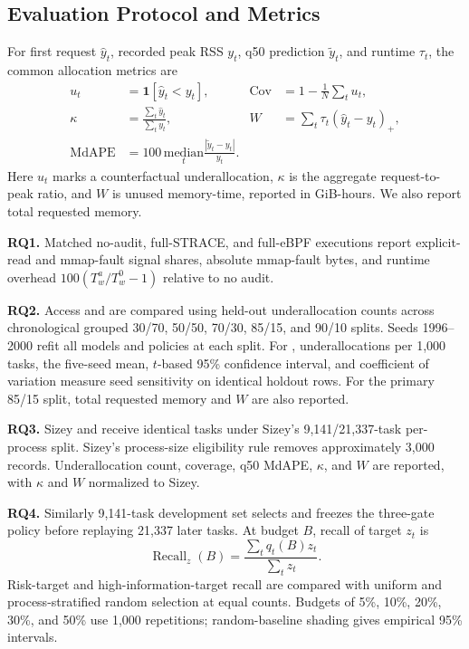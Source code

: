 \subsection{Evaluation Protocol and Metrics}

For first request $\hat y_t$, recorded peak RSS $y_t$, q50 prediction
$\tilde y_t$, and runtime $\tau_t$, the common allocation metrics are
\begin{align*}
u_t&=\mathbf1[\hat y_t<y_t], &
\mathrm{Cov}&=1-\frac{1}{N}\sum_tu_t,\\
\kappa&=\frac{\sum_t \hat y_t}{\sum_t y_t}, &
W&=\sum_t\tau_t(\hat y_t-y_t)_+,\\
\mathrm{MdAPE}&=100\,\underset{t}{\mathrm{median}}
 \frac{|\tilde y_t-y_t|}{y_t}.&&
\end{align*}
Here $u_t$ marks a counterfactual underallocation, $\kappa$ is the aggregate
request-to-peak ratio, and $W$ is unused memory-time, reported in GiB-hours.
We also report total requested memory.

\noindent\textbf{RQ1.} Matched no-audit, full-STRACE, and full-eBPF executions
report explicit-read and mmap-fault signal shares, absolute mmap-fault bytes,
and runtime overhead $100(T_w^a/T_w^0-1)$ relative to no audit.

\noindent\textbf{RQ2.} Access and \toolname{} are compared using held-out
underallocation counts across chronological grouped 30/70, 50/50, 70/30,
85/15, and 90/10 splits. Seeds 1996--2000 refit all models and policies at each
split. For \toolname{}, underallocations per 1,000 tasks, the five-seed mean,
$t$-based 95\% confidence interval, and coefficient of variation measure seed
sensitivity on identical holdout rows. For the primary 85/15 split, total
requested memory and $W$ are also reported.

\noindent\textbf{RQ3.} Sizey and \toolname{} receive identical tasks under
Sizey's 9,141/21,337-task per-process split. Sizey's process-size eligibility
rule removes approximately 3,000 records. Underallocation count, coverage, q50
MdAPE, $\kappa$, and $W$ are reported, with $\kappa$ and $W$ normalized to
Sizey.

\noindent\textbf{RQ4.} Similarly 9,141-task development set selects and freezes the
three-gate policy before replaying 21,337 later tasks. At budget $B$, recall of
target $z_t$ is
\begin{equation}
\operatorname{Recall}_z(B)=
\frac{\sum_t q_t(B)z_t}{\sum_t z_t}.
\label{eq:audit-recall}
\end{equation}
Risk-target and high-information-target recall are compared with uniform and
process-stratified random selection at equal counts. Budgets of 5\%, 10\%,
20\%, 30\%, and 50\% use 1,000 repetitions; random-baseline shading gives
empirical 95\% intervals.

